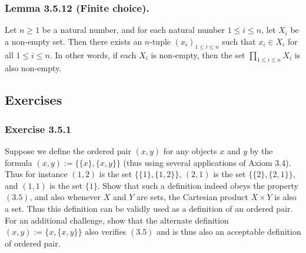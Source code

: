 \documentclass[12pt, letter]{article}
\begin{document}
\subsubsection*{Lemma 3.5.12 (Finite choice).}
Let $n\geq 1$ be a natural number, and for each natural number $1\leq i\leq n$, let $X_i$ be a non-empty set. Then there exists an $n$-tuple $(x_i)_{1\leq i\leq n}$
such that $x_i\in X_i$ for all $1\leq i\leq n$. In other words, if each $X_i$ is non-empty, then the set $\prod_{1\leq i\leq n}X_i$
is also non-empty.
\subsection*{Exercises}
\subsubsection*{Exercise 3.5.1}
Suppose we define the ordered pair $(x,y)$ for any objects $x$ and $y$ by the formula $(x,y):=\{\{x\},\{x,y\}\}$ (thus using several applications of Axiom 3.4).
Thus for instance $(1,2)$ is the set $\{\{1\},\{1,2\}\}$, $(2,1)$ is the set $\{\{2\},\{2,1\}\}$, and $(1,1)$ is the set $\{1\}$.
Show that such a definition indeed obeys the property $(3.5)$, and also whenever $X$ and $Y$ are sets, the Cartesian product $X\times Y$ is also a set. 
Thus this definition can be validly used as a definition of an ordered pair. For an additional challenge, show that the alternate definition $(x,y):=\{x,\{x,y\}\}
$ also verifies $(3.5)$ and is thus also an acceptable definition of ordered pair.
\end{document}
